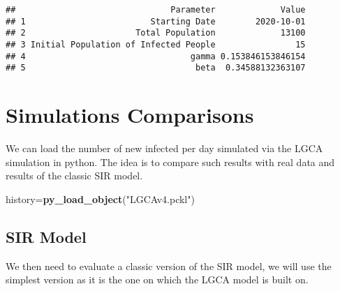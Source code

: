 \documentclass[
]{article}
\newenvironment{Shaded}{\begin{snugshade}}{\end{snugshade}}
\newcommand{\FunctionTok}[1]{\textcolor[rgb]{0.13,0.29,0.53}{\textbf{#1}}}
\newcommand{\NormalTok}[1]{#1}
\newcommand{\OtherTok}[1]{\textcolor[rgb]{0.56,0.35,0.01}{#1}}
\newcommand{\StringTok}[1]{\textcolor[rgb]{0.31,0.60,0.02}{#1}}
\begin{document}
\begin{verbatim}
##                               Parameter             Value
## 1                         Starting Date        2020-10-01
## 2                      Total Population             13100
## 3 Initial Population of Infected People                15
## 4                                 gamma 0.153846153846154
## 5                                  beta  0.34588132363107
\end{verbatim}

\section{Simulations Comparisons}\label{simulations-comparisons}

We can load the number of new infected per day simulated via the LGCA
simulation in python. The idea is to compare such results with real data
and results of the classic SIR model.

\begin{Shaded}
\begin{Highlighting}[]
\NormalTok{history}\OtherTok{=}\FunctionTok{py\_load\_object}\NormalTok{(}\StringTok{"LGCAv4.pckl"}\NormalTok{)}
\end{Highlighting}
\end{Shaded}

\subsection{SIR Model}\label{sir-model}

We then need to evaluate a classic version of the SIR model, we will use
the simplest version as it is the one on which the LGCA model is built
on.
\end{document}
